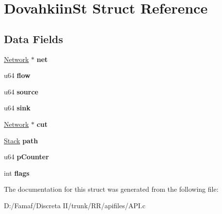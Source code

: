 \hypertarget{struct_dovahkiin_st}{\section{Dovahkiin\+St Struct Reference}
\label{struct_dovahkiin_st}
}
\subsection*{Data Fields}
\begin{DoxyCompactItemize}
\item 
\hypertarget{struct_dovahkiin_st_a4b31117247caf337e6cc13c59022d582}{\hyperlink{struct_network_st}{Network} $\ast$ {\bfseries net}}\label{struct_dovahkiin_st_a4b31117247caf337e6cc13c59022d582}

\item 
\hypertarget{struct_dovahkiin_st_a94d792c1c34d1a54b1332660f9722c9b}{u64 {\bfseries flow}}\label{struct_dovahkiin_st_a94d792c1c34d1a54b1332660f9722c9b}

\item 
\hypertarget{struct_dovahkiin_st_a93bfece41d3730a40b6a581ffe8a152c}{u64 {\bfseries source}}\label{struct_dovahkiin_st_a93bfece41d3730a40b6a581ffe8a152c}

\item 
\hypertarget{struct_dovahkiin_st_a090cc2a50683bf560655070ec2a655fe}{u64 {\bfseries sink}}\label{struct_dovahkiin_st_a090cc2a50683bf560655070ec2a655fe}

\item 
\hypertarget{struct_dovahkiin_st_aa808216233d652893e7191b30384b160}{\hyperlink{struct_network_st}{Network} $\ast$ {\bfseries cut}}\label{struct_dovahkiin_st_aa808216233d652893e7191b30384b160}

\item 
\hypertarget{struct_dovahkiin_st_ae85ca2a2c403330c0a44a6f704681e6d}{\hyperlink{struct_stack_st}{Stack} {\bfseries path}}\label{struct_dovahkiin_st_ae85ca2a2c403330c0a44a6f704681e6d}

\item 
\hypertarget{struct_dovahkiin_st_a187ad7ab0fd9b6a049bd07208f873061}{u64 {\bfseries p\+Counter}}\label{struct_dovahkiin_st_a187ad7ab0fd9b6a049bd07208f873061}

\item 
\hypertarget{struct_dovahkiin_st_ac8bf36fe0577cba66bccda3a6f7e80a4}{int {\bfseries flags}}\label{struct_dovahkiin_st_ac8bf36fe0577cba66bccda3a6f7e80a4}

\end{DoxyCompactItemize}


The documentation for this struct was generated from the following file\+:\begin{DoxyCompactItemize}
\item 
D\+:/\+Famaf/\+Discreta I\+I/trunk/\+R\+R/apifiles/A\+P\+I.\+c\end{DoxyCompactItemize}
